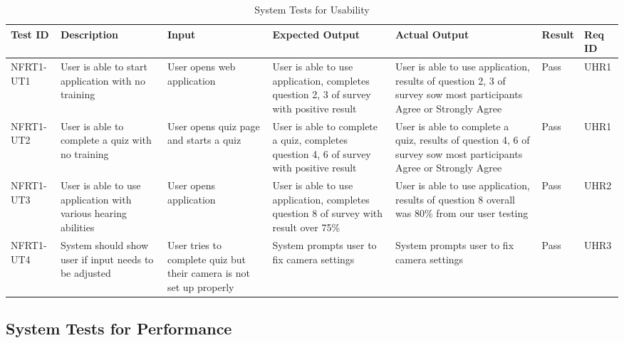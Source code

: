 \documentclass[12pt, titlepage]{article}
\begin{document}
\begin{longtable}{|p{1.5cm}|p{2.5cm}|p{2cm}|p{2cm}|p{2cm}|p{1.5cm}|p{1.5cm}|}
\caption{System Tests for Usability} \\
\hline
\textbf{Test ID} & \textbf{Description} & \textbf{Input} & \textbf{Expected Output} & \textbf{Actual Output} & \textbf{Result} & \textbf{Req ID}\\
\hline
NFRT1-UT1 & User is able to start application with no training & User opens web application & User is able to use application, completes question 2, 3 of survey with positive result & User is able to use application, results of question 2, 3 of survey sow most participants Agree or Strongly Agree & Pass & UHR1 \\
\hline
NFRT1-UT2 & User is able to complete a quiz with no training & User opens quiz page and starts a quiz & User is able to complete a quiz, completes question 4, 6 of survey with positive result & User is able to complete a quiz, results of question 4, 6 of survey sow most participants Agree or Strongly Agree & Pass & UHR1 \\
\hline
NFRT1-UT3 & User is able to use application with various hearing abilities & User opens application & User is able to use application, completes question 8 of survey with result over 75\% & User is able to use application, results of question 8 overall was 80\% from our user testing & Pass & UHR2 \\
\hline
NFRT1-UT4 & System should show user if input needs to be adjusted & User tries to complete quiz but their camera is not set up properly & System prompts user to fix camera settings & System prompts user to fix camera settings & Pass & UHR3 \\
\bottomrule
\end{longtable}



\RaggedRight
\subsection{System Tests for Performance}
\end{document}
